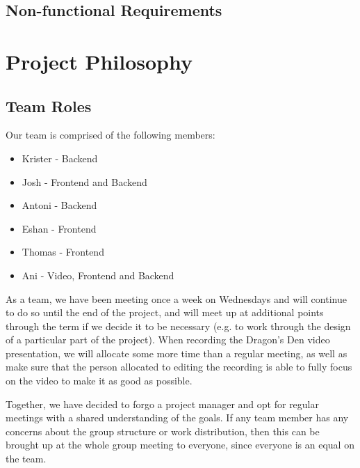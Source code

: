 \documentclass{article}
\begin{document}
\subsection{Non-functional Requirements}

\section{Project Philosophy}
\subsection{Team Roles}
Our team is comprised of the following members:

\begin{itemize}
  \item Krister - Backend 
  \item Josh - Frontend and Backend 
  \item Antoni - Backend 
  \item Eshan - Frontend
  \item Thomas - Frontend
  \item Ani - Video, Frontend and Backend
\end{itemize}

As a team, we have been meeting once a week on Wednesdays and will continue to do 
so until the end of the project, and will meet up at additional points through the term if we decide it to be necessary 
(e.g. to work through the design of a particular part of the project). When recording the Dragon's 
Den video presentation, we will allocate some more time than a regular meeting, as well as make sure that 
the person allocated to editing the recording is able to fully focus on the video to make it as good as possible. 

Together, we have decided to forgo a project manager and opt for regular meetings 
with a shared understanding of the goals. If any team member has any concerns about the group 
structure or work distribution, then this can be brought up at the whole group meeting 
to everyone, since everyone is an equal on the team.
\end{document}
